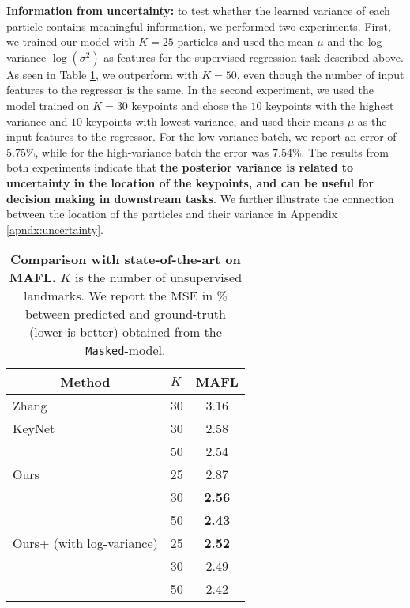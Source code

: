 \documentclass[nohyperref]{article}
\theoremstyle{plain}
\theoremstyle{definition}
\theoremstyle{remark}
\begin{document}
\textbf{Information from uncertainty:} to test whether the learned variance of each particle contains meaningful information, we performed two experiments. First, we trained our model with $K=25$ particles and used the mean $\mu$ and the log-variance $\log(\sigma^2)$ as features for the supervised regression task described above. As seen in Table \ref{tab:face-sota}, we outperform \citet{jakab2018unsupervised} with $K=50$, even though the number of input features to the regressor is the same. In the second experiment, we used the model trained on $K=30$ keypoints and chose the $10$ keypoints with the highest variance and $10$ keypoints with lowest variance, and used their means $\mu$ as the input features to the regressor. For the low-variance batch, we report an error of 5.75\%, while for the high-variance batch the error was 7.54\%. The results from both experiments indicate that \textbf{the posterior variance is related to uncertainty in the location of the keypoints, and can be useful for decision making in downstream tasks}. We further illustrate the connection between the location of the particles and their variance in Appendix \ref{apndx:uncertainty}. 


\begin{table}
\setlength{\tabcolsep}{4pt}
    \centering
    \begin{small}
    \begin{tabular}{@{}llc@{}}
    \toprule
    \multicolumn{1}{c}{Method}                    & $K$  & MAFL        \\ \midrule
    Zhang~\citep{zhang2018kp}            & 30   & 3.16                           \\
    KeyNet~\citep{jakab2018unsupervised}   & 30 &   2.58                            \\
                                            & 50 & 2.54                             \\ \midrule
    Ours                                    & 25   & 2.87                         \\
                                            & 30   & \textbf{2.56}                            \\
                                            & 50   & \textbf{2.43}                          \\ \midrule
    Ours+ (with log-variance)               & 25   & \textbf{2.52}                         \\
                                            & 30   & 2.49                            \\
                                            & 50   & 2.42                          \\ \bottomrule
    \end{tabular}
    \end{small}
    \caption{{\bf Comparison with state-of-the-art on MAFL.} $K$ is the number of unsupervised landmarks. We report the MSE in \% between predicted and ground-truth (lower is better) obtained from the \texttt{Masked}-model.}
    \label{tab:face-sota}
    \vspace{-2em}
\end{table}
\end{document}
